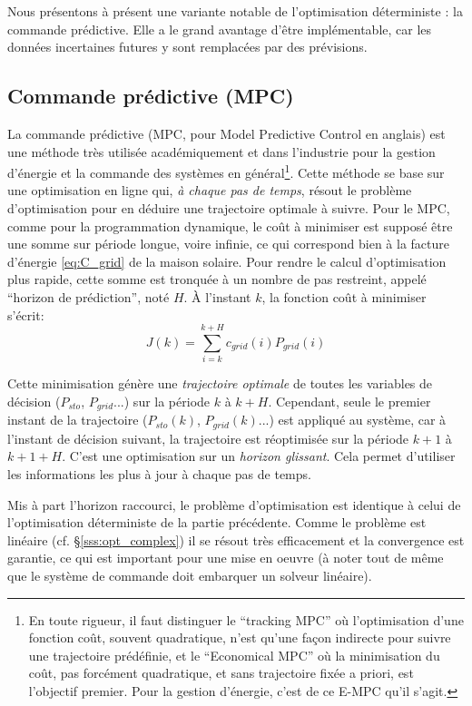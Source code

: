 \documentclass[a4paper,10pt,twocolumn]{article}
\begin{document}
Nous présentons à présent une variante notable de l'optimisation déterministe : la commande prédictive.
Elle a le grand avantage d'être implémentable, car les données incertaines futures y sont remplacées
par des prévisions.

\newpage

\subsection{Commande prédictive (MPC)}
\label{ss:mpc}

La commande prédictive (MPC, pour Model Predictive Control en anglais)
est une méthode très utilisée académiquement et dans l'industrie
pour la gestion d'énergie et la commande des systèmes en général\footnote{
  En toute rigueur, il faut distinguer le
  ``tracking MPC'' où l'optimisation d'une fonction coût, souvent quadratique,
  n'est qu'une façon indirecte pour suivre une trajectoire prédéfinie,
  et le ``Economical MPC'' où la minimisation du coût, pas forcément quadratique,
  et sans trajectoire fixée a priori, est l'objectif premier.
  Pour la gestion d'énergie, c'est de ce E-MPC qu'il s'agit.}.
Cette méthode se base sur une optimisation en ligne qui, \emph{à chaque pas de temps},
résout le problème d'optimisation pour en déduire une trajectoire optimale à suivre.
Pour le MPC, comme pour la programmation dynamique, le coût à minimiser est supposé
être une somme sur période longue, voire infinie,
ce qui correspond bien à la facture d'énergie \eqref{eq:C_grid} de la maison solaire.
Pour rendre le calcul d'optimisation plus rapide,
cette somme est tronquée à un nombre de pas restreint,
appelé ``horizon de prédiction'', noté $H$.
À l'instant $k$, la fonction coût à minimiser s'écrit:
%
\begin{equation} \label{eq:mpc_cost}
  J(k) = \sum_{i=k}^{k+H} c_{grid}(i)P_{grid}(i)
\end{equation} 

Cette minimisation génère une \emph{trajectoire optimale}
de toutes les variables de décision ($P_{sto}$, $P_{grid}$...)
sur la période $k$ à $k+H$.
Cependant, seule le premier instant de la trajectoire ($P_{sto}(k)$, $P_{grid}(k)$...)
est appliqué au système, car à l'instant de décision suivant,
la trajectoire est réoptimisée sur la période $k+1$ à $k+1+H$.
C'est une optimisation sur un \emph{horizon glissant}.
Cela permet d'utiliser les informations les plus à jour à chaque pas de temps.

Mis à part l'horizon raccourci, le problème d'optimisation
est identique à celui de l'optimisation déterministe de la partie précédente.
Comme le problème est linéaire (cf. §\ref{sss:opt_complex}) il se résout très efficacement
et la convergence est garantie, ce qui est important pour une mise en oeuvre
(à noter tout de même que le système de commande doit embarquer un solveur linéaire).
\end{document}
